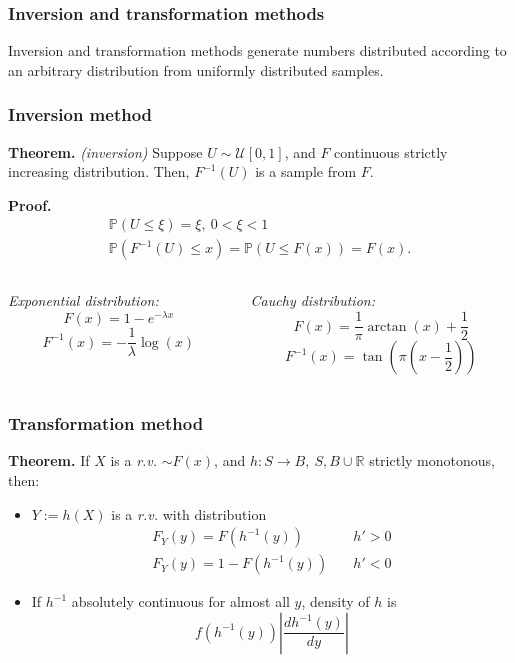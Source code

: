 \documentclass[10pt, serif, mathserif]{beamer}
\begin{document}
\begin{frame}
  \frametitle{Inversion and transformation methods}
  \begin{itemize}
  	Inversion and transformation methods generate numbers distributed according to
  	an arbitrary distribution from uniformly distributed samples.
  \end{itemize}
\end{frame}

\begin{frame}
  \frametitle{Inversion method}
  \textbf{Theorem.} \emph{(inversion)} Suppose $U \sim\mathcal{U}[0,1]$, and $F$ continuous strictly increasing distribution. Then,
    $F^{-1}(U)$ is a sample from $F$.

  \textbf{Proof.} \begin{gather*} 
    \mathbb{P}(U \leq \xi) = \xi,\ 0 < \xi < 1 \\
    \mathbb{P}(F^{-1}(U)\leq x) = \mathbb{P}(U \leq F(x)) = F(x).
  \end{gather*}
  \begin{columns}[t]
    \begin{column}{5cm}
      \centering \emph{Exponential distribution:}
      \[ F(x) = 1 - e^{-\lambda x}\]
      \[ F^{-1}(x) = -\frac{1}{\lambda} \log(x)\]
    \end{column}

    \begin{column}{5cm}
      \centering \emph{Cauchy distribution:}
      \[ F(x) = \frac{1}{\pi} \arctan(x) + \frac{1}{2} \]
      \[ F^{-1}(x) = \tan\left(\pi\left(x - \frac{1}{2}\right)\right)\]
    \end{column}
  \end{columns}
\end{frame}

\begin{frame}
  \frametitle{Transformation method}
  \textbf{Theorem.} If $X$ is a \emph{r.v.} $\sim F(x)$, and $h : S \to B,\ S,B\cup \mathbb{R}$ strictly monotonous, then:
  \medskip
  \begin{itemize}
    \item $Y := h(X)$ is a \emph{r.v.} with distribution
      \begin{align*} 
        F_Y(y) = F(h^{-1}(y)) & \quad h' > 0 \\
        F_Y(y) = 1 - F(h^{-1}(y)) & \quad h' < 0 
      \end{align*}
    \item If $h^{-1}$ absolutely continuous for almost all $y$, density of $h$ is
      \[
        f(h^{-1}(y)) \left| \frac{dh^{-1}(y)}{dy}\right|
      \]
  \end{itemize}
\end{frame}
\end{document}
